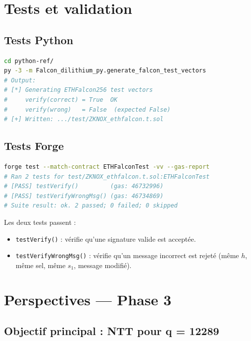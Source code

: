 \documentclass[11pt,a4paper]{article}
\begin{document}
\section{Tests et validation}

\subsection{Tests Python}

\begin{lstlisting}[language=bash,caption={Exécution des tests Python}]
cd python-ref/
py -3 -m Falcon_dilithium_py.generate_falcon_test_vectors
# Output:
# [*] Generating ETHFalcon256 test vectors
#     verify(correct) = True  OK
#     verify(wrong)   = False  (expected False)
# [+] Written: .../test/ZKNOX_ethfalcon.t.sol
\end{lstlisting}

\subsection{Tests Forge}

\begin{lstlisting}[language=bash,caption={Résultats forge test}]
forge test --match-contract ETHFalconTest -vv --gas-report
# Ran 2 tests for test/ZKNOX_ethfalcon.t.sol:ETHFalconTest
# [PASS] testVerify()         (gas: 46732996)
# [PASS] testVerifyWrongMsg() (gas: 46734869)
# Suite result: ok. 2 passed; 0 failed; 0 skipped
\end{lstlisting}

Les deux tests passent :
\begin{itemize}
  \item \texttt{testVerify()} : vérifie qu'une signature valide est acceptée.
  \item \texttt{testVerifyWrongMsg()} : vérifie qu'un message incorrect est
        rejeté (même $h$, même sel, même $s_1$, message modifié).
\end{itemize}

\section{Perspectives — Phase 3}

\subsection{Objectif principal : NTT pour q = 12289}
\end{document}
